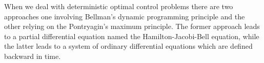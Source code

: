 When we deal with deterministic optimal control problems there are two approaches one involving Bellman's dynamic programming principle and the other relying on the Pontryagin's maximum principle. The former approach leads to a partial differential equation named the Hamilton-Jacobi-Bell equation, while the latter leads to a system of ordinary differential equations which are defined backward in time. 

